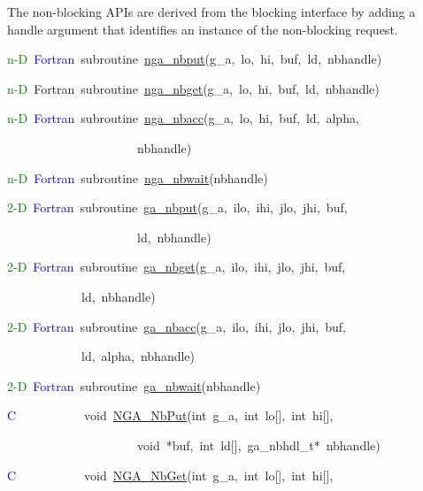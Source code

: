 The non-blocking APIs are derived from the blocking interface by adding
a handle argument that identifies an instance of the non-blocking
request.
\begin{lyxcode}
\textcolor{green}{n-D}~\textcolor{blue}{Fortran}~subroutine~\href{http://www.emsl.pnl.gov/docs/global/ga_ops.html\#nga_nbput}{nga\_{}nbput}(g\_a,~lo,~hi,~buf,~ld,~nbhandle)~

\textcolor{green}{n-D}~Fortran~subroutine~\href{http://www.emsl.pnl.gov/docs/global/ga_ops.html\#nga_nbget}{nga\_{}nbget}(g\_a,~lo,~hi,~buf,~ld,~nbhandle)~

\textcolor{green}{n-D}~\textcolor{blue}{Fortran}~subroutine~\href{http://www.emsl.pnl.gov/docs/global/ga_ops.html\#nga_nbacc}{nga\_{}nbacc}(g\_a,~lo,~hi,~buf,~ld,~alpha,~

~~~~~~~~~~~~~~~~~~~~~nbhandle)~

\textcolor{green}{n-D}~\textcolor{blue}{Fortran}~subroutine~\href{http://www.emsl.pnl.gov/docs/global/ga_ops.html\#nga_nbwait}{nga\_{}nbwait}(nbhandle)

\textcolor{green}{2-D}~\textcolor{blue}{Fortran}~subroutine~\href{http://www.emsl.pnl.gov/docs/global/ga_ops.html\#ga_nbput}{ga\_{}nbput}(g\_a,~ilo,~ihi,~jlo,~jhi,~buf,

~~~~~~~~~~~~~~~~~~~~~ld,~nbhandle)~

\textcolor{green}{2-D}~\textcolor{blue}{Fortran}~subroutine~\href{http://www.emsl.pnl.gov/docs/global/ga_ops.html\#ga_nbget}{ga\_{}nbget}(g\_a,~ilo,~ihi,~jlo,~jhi,~buf,~

~~~~~~~~~~~~ld,~nbhandle)~

\textcolor{green}{2-D}~\textcolor{blue}{Fortran}~subroutine~\href{http://www.emsl.pnl.gov/docs/global/ga_ops.html\#ga_nbacc}{ga\_{}nbacc}(g\_a,~ilo,~ihi,~jlo,~jhi,~buf,~

~~~~~~~~~~~~ld,~alpha,~nbhandle)~

\textcolor{green}{2-D}~\textcolor{blue}{Fortran}~subroutine~\href{http://www.emsl.pnl.gov/docs/global/ga_ops.html\#ga_nbwait}{ga\_{}nbwait}(nbhandle)

\textcolor{blue}{C}~~~~~~~~~~~void~\href{http://www.emsl.pnl.gov/docs/global/c_nga_ops.html\#ga_nbput}{NGA\_{}NbPut}(int~g\_a,~int~lo{[}{]},~int~hi{[}{]},~

~~~~~~~~~~~~~~~~~~~~~void~{*}buf,~int~ld{[}{]},~ga\_nbhdl\_t{*}~nbhandle)~

\textcolor{blue}{C}~~~~~~~~~~~void~\href{http://www.emsl.pnl.gov/docs/global/c_nga_ops.html\#ga_nbget}{NGA\_{}NbGet}(int~g\_a,~int~lo{[}{]},~int~hi{[}{]},~


\end{lyxcode}

